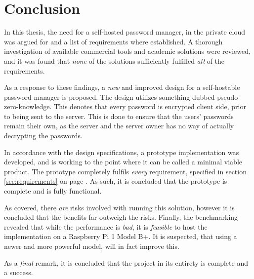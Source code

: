 \chapter{Conclusion}
	In this thesis, the need for a self-hosted password manager, in the private cloud was argued for and a list of requirements where established. A thorough investigation of available commercial tools and academic solutions were reviewed, and it was found that \emph{none} of the solutions sufficiently fulfilled \emph{all} of the requirements.

	As a response to these findings, a \emph{new} and improved design for a self-hostable password manager is proposed. The design utilizes something dubbed pseudo-zero-knowledge. This denotes that every password is encrypted client side, prior to being sent to the server. This is done to ensure that the users' passwords remain their own, as the server and the server owner has no way of actually decrypting the passwords.

	In accordance with the design specifications, a prototype implementation was developed, and is working to the point where it can be called a minimal viable product. The prototype completely fulfils \emph{every} requirement, specified in section \ref{sec:requirements} on page \pageref{sec:requirements}. As such, it is concluded that the prototype is complete and is fully functional.

	As covered, there \emph{are} risks involved with running this solution, however it is concluded that the benefits far outweigh the risks. Finally, the benchmarking revealed that while the performance is \emph{bad}, it is \emph{feasible} to host the implementation on a Raspberry Pi 1 Model B+. It is suspected, that using a newer and more powerful model, will in fact improve this. 

	As a \emph{final} remark, it is concluded that the project in its entirety is complete and a success.